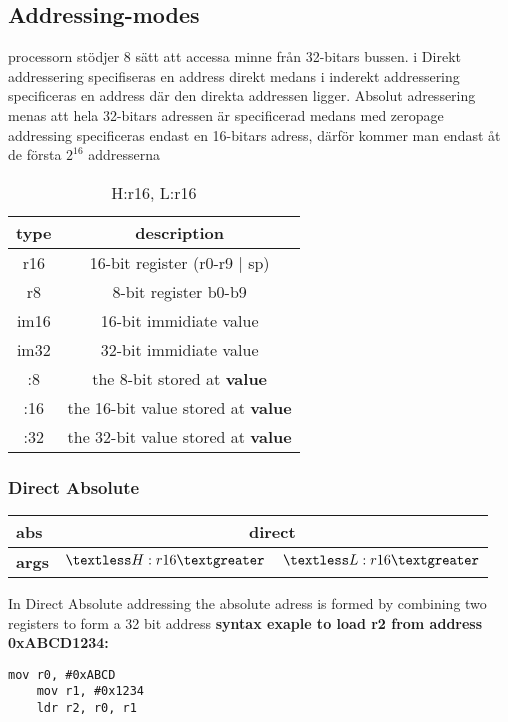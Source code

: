 \documentclass{article}
\begin{document}
	\subsection*{Addressing-modes}
	processorn stödjer 8 sätt att accessa minne från 32-bitars bussen.
	i Direkt addressering specifiseras en address direkt medans
	i inderekt addressering specificeras en address där den direkta addressen ligger.
	Absolut adressering menas att hela 32-bitars adressen är specificerad
	medans med zeropage addressing specificeras endast en 16-bitars adress, därför kommer man endast åt de första \(2^16\) addresserna
	\newline
	\begin{table}[H]
		\centering
		\begin{tabular}{|c|c|}
		\hline
		\textbf{type} & \textbf{description}\\
		\hline
		r16 & 16-bit register (r0-r9 | sp) \\
		\hline
		r8 & 8-bit register b0-b9 \\
		\hline
		im16 & 16-bit immidiate value \\
		\hline
		im32 & 32-bit immidiate value \\
		\hline
		[\textbf{value}]:8 & the 8-bit stored at \textbf{value} \\
		\hline
		[\textbf{value}]:16 & the 16-bit value stored at \textbf{value} \\
		\hline
		[\textbf{value}]:32 & the 32-bit value stored at \textbf{value} \\
		\hline
		\end{tabular}
		\caption{H:r16, L:r16}
		\label{tab:dir-abs}
	\end{table}
	\subsubsection*{Direct Absolute}
	\begin{table}[H]
		\centering
		\begin{tabular}{|p{2cm}|p{2cm}|p{2cm}|}
		\hline
		\textbf{abs} & \multicolumn{2}{|c|}{direct} \\
		\hline
		\textbf{args} & \(\textless H:r16 \textgreater\) & \(\textless L:r16 \textgreater\) \\
		\hline
		\end{tabular}
	\end{table}
	In Direct Absolute addressing the absolute adress is formed by
	combining two registers to form a 32 bit address
	\newline
	\textbf{syntax exaple to load r2 from address 0xABCD1234:}
	\newline
	\begin{needspace}{\baselineskip}
	\begin{lstlisting}[language=ASM, label={lst:armcode}]
	mov r0, #0xABCD
	mov r1, #0x1234
	ldr r2, r0, r1
	\end{lstlisting}
	\end{needspace}
\end{document}
